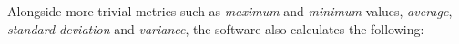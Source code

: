 Alongside more trivial metrics such as \emph{maximum} and \emph{minimum} values, \emph{average}, \emph{standard deviation} and \emph{variance}, the software also calculates the following:
%
